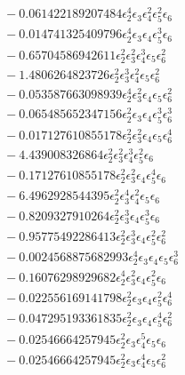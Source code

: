 \documentclass[10pt]{article}
\begin{document}
\begin{align*}
&{}  - 0.061422189207484 \epsilon_{2}^{4} \epsilon_{3} \epsilon_{4}^{2} \epsilon_{5}^{2} \epsilon_{6} \\
&{}  - 0.014741325409796 \epsilon_{2}^{4} \epsilon_{3} \epsilon_{4} \epsilon_{5}^{3} \epsilon_{6} \\
&{}  - 0.65704586942611 \epsilon_{2}^{2} \epsilon_{3}^{2} \epsilon_{4}^{3} \epsilon_{5} \epsilon_{6}^{2} \\
&{}  - 1.4806264823726 \epsilon_{2}^{2} \epsilon_{3}^{3} \epsilon_{4}^{2} \epsilon_{5} \epsilon_{6}^{2} \\
&{}  - 0.053587663098939 \epsilon_{2}^{4} \epsilon_{3}^{2} \epsilon_{4} \epsilon_{5} \epsilon_{6}^{2} \\
&{}  - 0.065485652347156 \epsilon_{2}^{2} \epsilon_{3} \epsilon_{4} \epsilon_{5}^{3} \epsilon_{6}^{3} \\
&{}  - 0.017127610855178 \epsilon_{2}^{2} \epsilon_{3}^{2} \epsilon_{4} \epsilon_{5} \epsilon_{6}^{4} \\
&{}  - 4.439008326864 \epsilon_{2}^{2} \epsilon_{3}^{2} \epsilon_{4}^{3} \epsilon_{5}^{2} \epsilon_{6} \\
&{}  - 0.17127610855178 \epsilon_{2}^{2} \epsilon_{3}^{2} \epsilon_{4} \epsilon_{5}^{4} \epsilon_{6} \\
&{}  - 6.4962928544395 \epsilon_{2}^{2} \epsilon_{3}^{4} \epsilon_{4}^{2} \epsilon_{5} \epsilon_{6} \\
&{}  - 0.8209327910264 \epsilon_{2}^{2} \epsilon_{3}^{3} \epsilon_{4} \epsilon_{5}^{3} \epsilon_{6} \\
&{}  - 0.95775492286413 \epsilon_{2}^{2} \epsilon_{3}^{3} \epsilon_{4} \epsilon_{5}^{2} \epsilon_{6}^{2} \\
&{}  - 0.0024568875682993 \epsilon_{2}^{4} \epsilon_{3} \epsilon_{4} \epsilon_{5} \epsilon_{6}^{3} \\
&{}  - 0.16076298929682 \epsilon_{2}^{4} \epsilon_{3}^{2} \epsilon_{4} \epsilon_{5}^{2} \epsilon_{6} \\
&{}  - 0.022556169141798 \epsilon_{2}^{2} \epsilon_{3} \epsilon_{4} \epsilon_{5}^{2} \epsilon_{6}^{4} \\
&{}  - 0.047295193361835 \epsilon_{2}^{2} \epsilon_{3} \epsilon_{4} \epsilon_{5}^{4} \epsilon_{6}^{2} \\
&{}  - 0.02546664257945 \epsilon_{2}^{2} \epsilon_{3} \epsilon_{4}^{5} \epsilon_{5} \epsilon_{6} \\
&{}  - 0.02546664257945 \epsilon_{2}^{2} \epsilon_{3} \epsilon_{4}^{4} \epsilon_{5} \epsilon_{6}^{2} \\

\end{align*}
\end{document}
